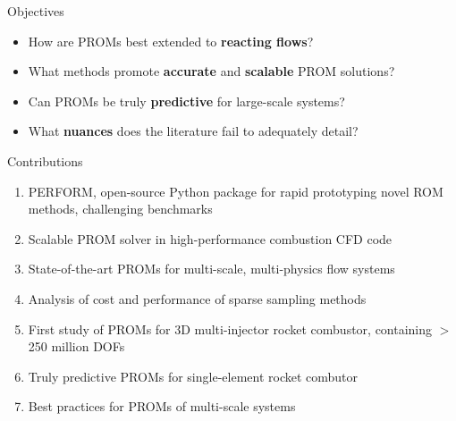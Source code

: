 \documentclass[]{beamer}
\begin{document}
\begin{frame}{Objectives}
	\begin{itemize}
		\item How are PROMs best extended to \textbf{reacting flows}?
		\item What methods promote \textbf{accurate} and \textbf{scalable} PROM solutions? 
		\item Can PROMs be truly \textbf{predictive} for large-scale systems?
		\item What \textbf{nuances} does the literature fail to adequately detail?
	\end{itemize}

	\begin{figure}
		\begin{minipage}{0.49\linewidth}

		\end{minipage}
		\begin{minipage}{0.45\linewidth}
		\end{minipage}
	\end{figure}
\end{frame}

\begin{frame}{Contributions}
    \begin{enumerate}
		\item PERFORM, open-source Python package for rapid prototyping novel ROM methods, challenging benchmarks
		\item Scalable PROM solver in high-performance combustion CFD code
        \item State-of-the-art PROMs for multi-scale, multi-physics flow systems
        \item Analysis of cost and performance of sparse sampling methods
        \item First study of PROMs for 3D multi-injector rocket combustor, containing $>$ 250 million DOFs
        \item Truly predictive PROMs for single-element rocket combutor
        \item Best practices for PROMs of multi-scale systems
    \end{enumerate}
\end{frame}
\end{document}
